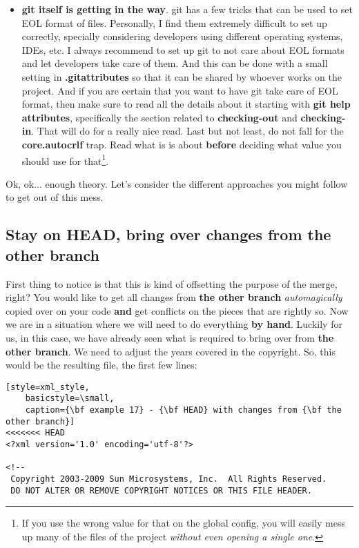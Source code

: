\begin{itemize}
	\item {\bf git itself is getting in the way}. git has a few tricks that can be used to set EOL format of files. Personally,
	I find them extremely difficult to set up correctly, specially considering developers using different operating systems,
	IDEs, etc. I always recommend to set up git to not care about EOL formats and let developers take care of them. And this can
	be done with a small setting in {\bf .gitattributes} so that it can be shared by whoever works on the project. And if you are
	certain that you want to have git take care of EOL format, then make sure to read all the details about it starting with
	{\bf git help attributes}, specifically the section related to {\bf checking-out} and {\bf checking-in}. That will do for a really
	nice read. Last but not least, do not fall for the {\bf core.autocrlf} trap. Read what is is about {\bf before} deciding what
	value you should use for that\footnote{If you use the wrong value for that on the global config, you will easily mess up many of
	the files of the project {\it without even opening a single one}.}.
	
\end{itemize}

Ok, ok... enough theory. Let's consider the different approaches you might follow to get out of this mess.

\subsection*{Stay on HEAD, bring over changes from the other branch}

First thing to notice is that this is kind of offsetting the purpose of the merge, right? You would like to get all changes from
{\bf the other branch} {\it automagically} copied over on your code {\bf and} get conflicts on the pieces that are rightly so.
Now we are in a situation where we will need to do everything {\bf by hand}. Luckily for us, in this case, we have already seen what is
required to bring over from {\bf the other branch}. We need to adjust the years covered in the copyright. So, this would be the
resulting file, the first few lines:

\begin{lstlisting}[style=xml_style,
	basicstyle=\small,
	caption={\bf example 17} - {\bf HEAD} with changes from {\bf the other branch}]
<<<<<<< HEAD
<?xml version='1.0' encoding='utf-8'?>

<!--
 Copyright 2003-2009 Sun Microsystems, Inc.  All Rights Reserved.
 DO NOT ALTER OR REMOVE COPYRIGHT NOTICES OR THIS FILE HEADER.
\end{lstlisting}

